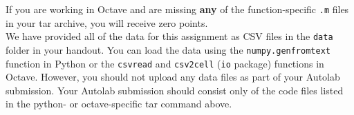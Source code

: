 \documentclass[a4paper]{article}
\theoremstyle{definition}
\begin{document}
If you are working in Octave and are missing \textbf{any} of the function-specific \texttt{.m} files in your tar archive, you will receive zero points.\\

We have provided all of the data for this assignment as CSV files in the \texttt{data} folder in your handout. You can load the data using the \texttt{numpy.genfromtext} function in Python or the \texttt{csvread} and \texttt{csv2cell} (\texttt{io} package) functions in Octave. However, you should not upload any data files as part of your Autolab submission. Your Autolab submission should consist only of the code files listed in the python- or octave-specific tar command above.




\end{document}
